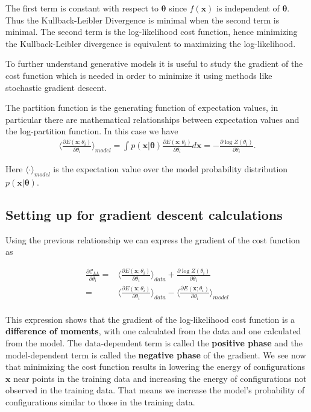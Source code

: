 \documentclass[%
oneside,                 %
final,                   %
10pt]{article}
\begin{document}
The first term is constant with respect to $\bm{\theta}$ since $f(\bm{x})$ is independent of $\bm{\theta}$. Thus the Kullback-Leibler Divergence is minimal when the second term is minimal. The second term is the log-likelihood cost function, hence minimizing the Kullback-Leibler divergence is equivalent to maximizing the log-likelihood.

To further understand generative models it is useful to study the
gradient of the cost function which is needed in order to minimize it
using methods like stochastic gradient descent. 

The partition function is the generating function of
expectation values, in particular there are mathematical relationships
between expectation values and the log-partition function. In this
case we have
\begin{align}
	\langle \frac{ \partial E(\bm{x}; \theta_i) } { \partial \theta_i} \rangle_{model}
	= \int p(\bm{x}| \bm{\theta}) \frac{ \partial E(\bm{x}; \theta_i) } { \partial \theta_i} d\bm{x} 
	= -\frac{\partial \log Z(\theta_i)}{ \partial  \theta_i} .
\end{align}

Here $\langle \cdot \rangle_{model}$ is the expectation value over the model probability distribution $p(\bm{x}| \bm{\theta})$.

\subsection{Setting up for gradient descent calculations}

Using the previous relationship we can express the gradient of the cost function as

\begin{align}
	\frac{\partial \mathcal{C}_{LL}}{\partial \theta_i}
	=& \langle \frac{ \partial E(\bm{x}; \theta_i) } { \partial \theta_i} \rangle_{data} + \frac{\partial \log Z(\theta_i)}{ \partial  \theta_i} \\
	=& \langle \frac{ \partial E(\bm{x}; \theta_i) } { \partial \theta_i} \rangle_{data} - \langle \frac{ \partial E(\bm{x}; \theta_i) } { \partial \theta_i} \rangle_{model} \\
\end{align}

This expression shows that the gradient of the log-likelihood cost
function is a \textbf{difference of moments}, with one calculated from
the data and one calculated from the model. The data-dependent term is
called the \textbf{positive phase} and the model-dependent term is
called the \textbf{negative phase} of the gradient. We see now that
minimizing the cost function results in lowering the energy of
configurations $\bm{x}$ near points in the training data and
increasing the energy of configurations not observed in the training
data. That means we increase the model's probability of configurations
similar to those in the training data.
\end{document}
